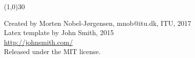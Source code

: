 \documentclass[11pt,letter,landscape]{scrartcl} %
\begin{document}
\begin{multicols}{2}
\vspace{\baselineskip}
\linethickness{0.5mm} %
{\color{mygray}\line(1,0){30}} %

\footnotesize{
Created by Morten Nobel-Jørgensen, mnob@itu.dk, ITU, 2017\\
Latex template by John Smith, 2015\\
\url{http://johnsmith.com/}\\
Released under the MIT license.
}

\end{multicols}

\end{document}
